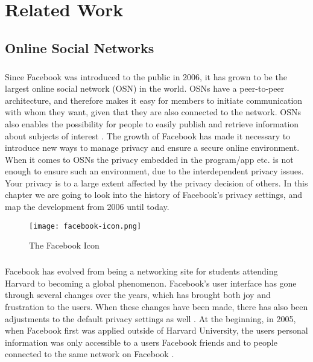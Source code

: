 \chapter{Related Work}
\label{chp:relatedwork} 

\section{Online Social Networks}\label{sec:first_section}
\paragraph{}
Since Facebook was introduced to the public in 2006, it has grown to be the largest online social network (OSN) in the world. OSNs have a peer-to-peer architecture, and therefore makes it easy for members to initiate communication with whom they want, given that they are also connected to the network. OSNs also enables the possibility for people to easily publish and retrieve information about subjects of interest \cite{DPBook}. The growth of Facebook has made it necessary to introduce new ways to manage privacy and ensure a secure online environment. When it comes to OSNs the privacy embedded in the program/app etc. is not enough to ensure such an environment, due to the interdependent privacy issues. Your privacy is to a large extent affected by the privacy decision of others. In this chapter we are going to look into the history of Facebook’s privacy settings, and map the development from 2006 until today. 

\begin{figure}[h!]
\centering
\texttt{[image: facebook-icon.png]}
\caption{The Facebook Icon}
\end{figure}

\paragraph{}
Facebook has evolved from being a networking site for students attending Harvard to becoming a global phenomenon. Facebook's user interface has gone through several changes over the years, which has brought both joy and frustration to the users. When these changes have been made, there has also been adjustments to the default privacy settings as well \cite{EvoPriv2}. At the beginning, in 2005, when Facebook first was applied outside of Harvard University, the users personal information was only accessible to a users Facebook friends and to people connected to the same network on Facebook \cite{EvoPriv}. 

